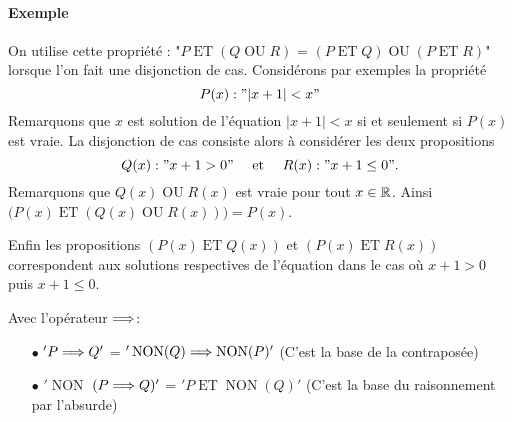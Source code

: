 \documentclass[a4paper, 11pt]{article}
\DeclareMathOperator{\NON}{NON}
\DeclareMathOperator{\ET}{ET}
\DeclareMathOperator{\OU}{OU}
\begin{document}
\paragraph{Exemple}
 On utilise cette propriété : "$P \ET (Q \OU R)$ = $(P \ET Q) \OU (P\ET R)$" lorsque l'on fait une disjonction de cas. Considérons par exemples la propriété $$P(x): "|x+1|<x"$$
 Remarquons que $x$ est solution de l'équation $|x+1|<x$ si et seulement si $P(x)$ est vraie. La disjonction de cas consiste alors à considérer les deux propositions 
 $$Q(x):"x+1>0" \quad \text{ et } \quad R(x):"x+1\leq 0".$$
Remarquons que $Q(x) \OU R(x)$ est vraie pour tout $x\in \mathbb{R}$. Ainsi $\Big(P(x) \ET (Q(x) \OU R(x))\Big)=P(x)$. 
 
Enfin les propositions $(P(x) \ET Q(x)) $ et $(P(x) \ET R(x))$ correspondent aux solutions respectives de l'équation dans le cas où $x+1>0$ puis $x+1\leq 0$. 


 

 
 

 


\begin{prop}\label{regle operateur implique} Avec l'op\'erateur $\Longrightarrow$:
\begin{itemize}
\item[$\bullet$]  $'P \Longrightarrow  Q'$ = $'\NON(Q)  \implique  \NON(P)'$ (C'est la base de la contraposée) 
\item[$\bullet$]  $'\NON$ $(P \Longrightarrow  Q)'$ = $'P  \ET \NON(Q)'$ (C'est la base du raisonnement par l'absurde)
\end{itemize}
\end{prop}
\end{document}
